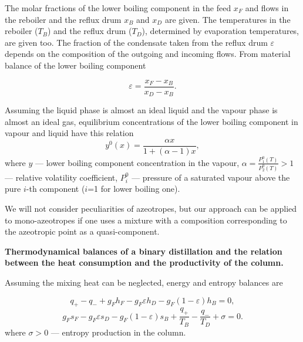 \documentclass[12pt]{article}
\begin{document}
   The molar fractions of the lower boiling component in the feed $x_{F}$ and flows in the reboiler and the reflux drum $x_{B}$ and $x_{D}$ are given. The temperatures in the reboiler ($T_B$) and the reflux drum ($T_D$), determined by evaporation temperatures, are given too. The fraction of the condensate taken from the reflux drum $\varepsilon$ depends on the composition of the outgoing and incoming flows. From material balance of the lower boiling component

\begin{equation}\label{2}
\varepsilon=\frac{x_F-x_B}{x_D-x_B}.
\end{equation}

Assuming the liquid phase is almost an ideal liquid and the vapour phase is almost an ideal gas,  equilibrium concentrations of the lower boiling component in vapour and liquid have this relation
\begin{equation}\label{5.42}
y^0(x)= \frac{\alpha x}{1+(\alpha-1)x},
\end{equation}
where  $y$ --- lower boiling component concentration in the vapour, $\alpha= \frac{P_1^0(T)}{P_2^0(T)}>1$ --- relative volatility coefficient, $P_i^0$ --- pressure of a saturated vapour above the pure $i$-th component ($i$=1 for lower boiling one). 

We will not consider peculiarities of azeotropes, but our approach can be applied to mono-azeotropes if one uses a mixture with a composition corresponding to the azeotropic point as a quasi-component.

\vspace*{0.3cm}
\textbf{Thermodynamical balances of a binary distillation and the relation between the heat consumption and  the productivity of the column.}

Assuming the mixing heat can be neglected, energy and entropy balances are 

\begin{equation}\label{5.44}
q_{+} - q_{-} + g_{F} h_{F} - g_{F}\varepsilon h_{D} - g_{F}(1-\varepsilon) h_{B} = 0,
\end{equation}
\begin{equation}\label{5.45}
g_{F} s_{F} - g_{F}\varepsilon s_{D} - g_{F}(1-\varepsilon) s_{B}+ \frac{q_{+}}{T_B} -
\frac{q_{-}}{T_D} + \sigma = 0.
\end{equation}
where $\sigma>0$  --- entropy production in the column.
 
\end{document}
